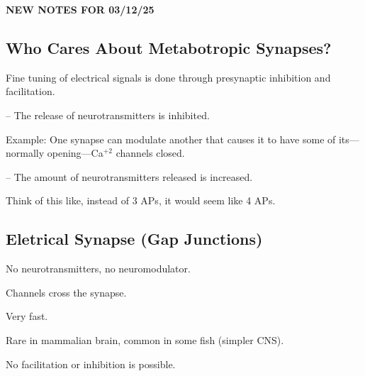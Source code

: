 \begin{center}
    \textbf{NEW NOTES FOR 03/12/25} \\
    \hrulefill
\end{center}

\subsection{Who Cares About Metabotropic Synapses?}

\begin{coloredlist}
    \item Fine tuning of electrical signals is done through presynaptic inhibition and facilitation.
    \begin{coloredlist}
        \item {} -- The release of neurotransmitters is inhibited. 
    \begin{coloredlist}
        \item Example: One synapse can modulate another that causes it to have some of its---normally opening---Ca\(^{+2}\) channels closed.
        \end{coloredlist}
        \item {} -- The amount of neurotransmitters released is increased. 
        \begin{coloredlist}
            \item Think of this like, instead of 3 APs, it would seem like 4 APs.
        \end{coloredlist}
    \end{coloredlist}
\end{coloredlist}

\subsection{Eletrical Synapse (Gap Junctions)}

\begin{coloredlist}
    \item No neurotransmitters, no neuromodulator.
    \item Channels cross the synapse.
    \item Very fast.
    \item Rare in mammalian brain, common in some fish (simpler CNS).
    \item No facilitation or inhibition is possible.
\end{coloredlist}

